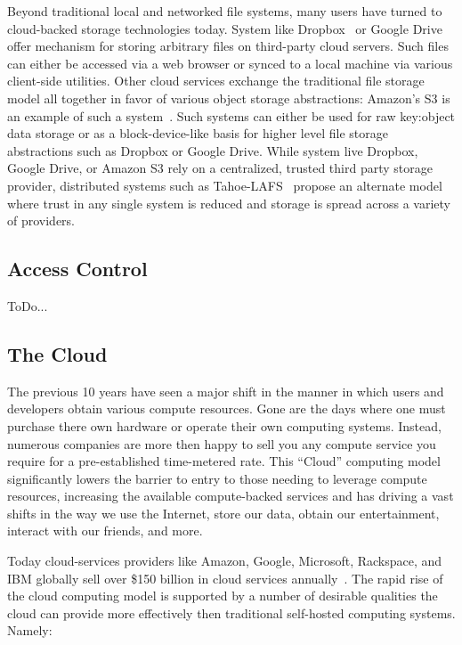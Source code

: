 Beyond traditional local and networked file systems, many users have
turned to cloud-backed storage technologies today. System like
Dropbox~\cite{dropbox} or Google Drive~\cite{google-drive} offer
mechanism for storing arbitrary files on third-party cloud
servers. Such files can either be accessed via a web browser or synced
to a local machine via various client-side utilities. Other cloud
services exchange the traditional file storage model all together in
favor of various object storage abstractions: Amazon's S3 is an
example of such a system~\cite{amazon-s3}. Such systems can either be
used for raw key:object data storage or as a block-device-like basis
for higher level file storage abstractions such as Dropbox or Google
Drive. While system live Dropbox, Google Drive, or Amazon S3 rely on a
centralized, trusted third party storage provider, distributed systems
such as Tahoe-LAFS~\cite{Wilcox-O'Hearn2008} propose an alternate
model where trust in any single system is reduced and storage is
spread across a variety of providers.

\subsection{Access Control}

ToDo...

\subsection{The Cloud}

The previous 10 years have seen a major shift in the manner in which
users and developers obtain various compute resources. Gone are the
days where one must purchase there own hardware or operate their own
computing systems. Instead, numerous companies are more then happy to
sell you any compute service you require for a pre-established
time-metered rate. This ``Cloud'' computing model significantly lowers
the barrier to entry to those needing to leverage compute resources,
increasing the available compute-backed services and has driving a
vast shifts in the way we use the Internet, store our data, obtain our
entertainment, interact with our friends, and more.

Today cloud-services providers like Amazon, Google, Microsoft,
Rackspace, and IBM globally sell over \$150 billion in cloud services
annually~\cite{Flood2013}. The rapid rise of the cloud computing model
is supported by a number of desirable qualities the cloud can provide
more effectively then traditional self-hosted computing
systems. Namely:

